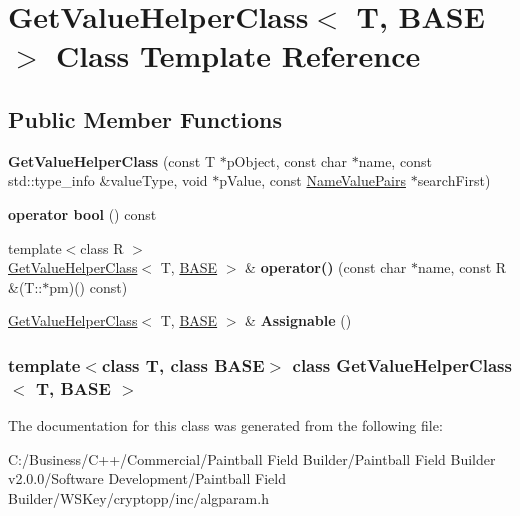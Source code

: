 \hypertarget{class_get_value_helper_class}{
\section{GetValueHelperClass$<$ T, BASE $>$ Class Template Reference}
\label{class_get_value_helper_class}
}
\subsection*{Public Member Functions}
\begin{DoxyCompactItemize}
\item 
\hypertarget{class_get_value_helper_class_ac9e1b57dc7e82e22f7add4ebfdaa17f6}{
{\bfseries GetValueHelperClass} (const T $\ast$pObject, const char $\ast$name, const std::type\_\-info \&valueType, void $\ast$pValue, const \hyperlink{class_name_value_pairs}{NameValuePairs} $\ast$searchFirst)}
\label{class_get_value_helper_class_ac9e1b57dc7e82e22f7add4ebfdaa17f6}

\item 
\hypertarget{class_get_value_helper_class_ab2b24b020becb92463ad37d6e2fa7760}{
{\bfseries operator bool} () const }
\label{class_get_value_helper_class_ab2b24b020becb92463ad37d6e2fa7760}

\item 
\hypertarget{class_get_value_helper_class_a0604b4c8135d6c301fe1a6414ebac2bc}{
{\footnotesize template$<$class R $>$ }\\\hyperlink{class_get_value_helper_class}{GetValueHelperClass}$<$ T, \hyperlink{class_b_a_s_e}{BASE} $>$ \& {\bfseries operator()} (const char $\ast$name, const R \&(T::$\ast$pm)() const)}
\label{class_get_value_helper_class_a0604b4c8135d6c301fe1a6414ebac2bc}

\item 
\hypertarget{class_get_value_helper_class_aeac7c76df217ccdab37359d399b76355}{
\hyperlink{class_get_value_helper_class}{GetValueHelperClass}$<$ T, \hyperlink{class_b_a_s_e}{BASE} $>$ \& {\bfseries Assignable} ()}
\label{class_get_value_helper_class_aeac7c76df217ccdab37359d399b76355}

\end{DoxyCompactItemize}
\subsubsection*{template$<$class T, class BASE$>$ class GetValueHelperClass$<$ T, BASE $>$}



The documentation for this class was generated from the following file:\begin{DoxyCompactItemize}
\item 
C:/Business/C++/Commercial/Paintball Field Builder/Paintball Field Builder v2.0.0/Software Development/Paintball Field Builder/WSKey/cryptopp/inc/algparam.h\end{DoxyCompactItemize}

